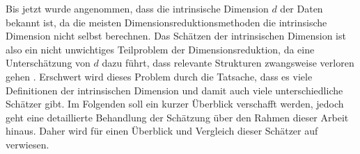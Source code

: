 Bis jetzt wurde angenommen, dass die intrinsische Dimension $d$ der Daten bekannt ist, da die
meisten Dimensionsreduktionsmethoden die intrinsische Dimension nicht selbst berechnen. Das
Schätzen der intrinsischen Dimension ist also ein nicht unwichtiges Teilproblem der
Dimensionsreduktion, da eine Unterschätzung von $d$ dazu führt, dass relevante Strukturen
zwangsweise verloren gehen \parencite[1]{Levina.2004}. Erschwert wird dieses Problem durch die Tatsache, dass es viele
Definitionen der intrinsischen Dimension und damit auch viele unterschiedliche Schätzer gibt. Im
Folgenden soll ein kurzer Überblick verschafft werden, jedoch geht eine detaillierte Behandlung der
Schätzung über den Rahmen dieser Arbeit hinaus. Daher wird für einen Überblick und Vergleich dieser
Schätzer auf \textcites{Campadelli.2015}{Bac.2021}{Verveer.1995} verwiesen.

